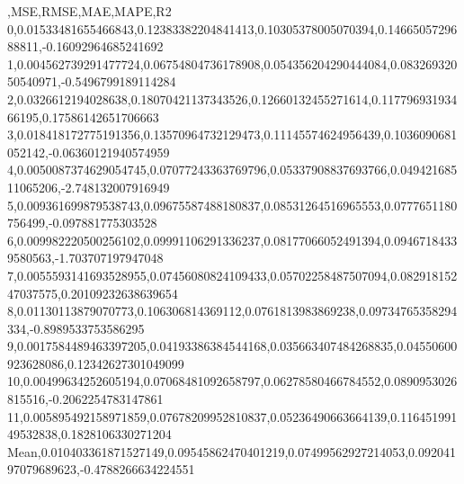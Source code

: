 ,MSE,RMSE,MAE,MAPE,R2
0,0.01533481655466843,0.12383382204841413,0.10305378005070394,0.1466505729688811,-0.16092964685241692
1,0.004562739291477724,0.06754804736178908,0.054356204290444084,0.08326932050540971,-0.5496799189114284
2,0.0326612194028638,0.18070421137343526,0.12660132455271614,0.11779693193466195,0.17586142651706663
3,0.018418172775191356,0.13570964732129473,0.11145574624956439,0.1036090681052142,-0.06360121940574959
4,0.0050087374629054745,0.07077243363769796,0.05337908837693766,0.04942168511065206,-2.748132007916949
5,0.009361699879538743,0.09675587488180837,0.08531264516965553,0.0777651180756499,-0.097881775303528
6,0.009982220500256102,0.09991106291336237,0.08177066052491394,0.09467184339580563,-1.703707197947048
7,0.0055593141693528955,0.07456080824109433,0.05702258487507094,0.08291815247037575,0.20109232638639654
8,0.01130113879070773,0.106306814369112,0.0761813983869238,0.09734765358294334,-0.8989533753586295
9,0.0017584489463397205,0.04193386384544168,0.035663407484268835,0.04550600923628086,0.12342627301049099
10,0.00499634252605194,0.07068481092658797,0.06278580466784552,0.0890953026815516,-0.2062254783147861
11,0.005895492158971859,0.07678209952810837,0.05236490663664139,0.11645199149532838,0.1828106330271204
Mean,0.010403361871527149,0.09545862470401219,0.07499562927214053,0.09204197079689623,-0.4788266634224551
